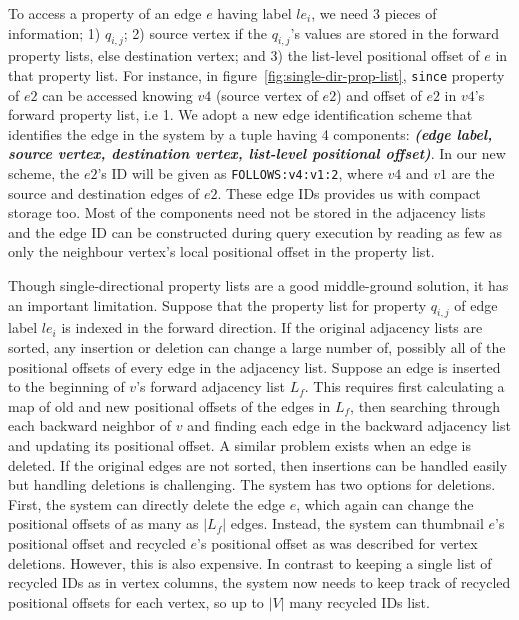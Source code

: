 To access a property of an edge $e$ having label $le_i$, we need 3 pieces of information; 1) $q_{i,j}$; 2) source vertex if the $q_{i,j}$'s values are stored in the forward property lists, else destination vertex; and 3) the list-level positional offset of $e$ in that property list. For instance, in figure~\ref{fig:single-dir-prop-list}, \texttt{since} property of $e2$ can be accessed knowing $v4$ (source vertex of $e2$) and offset of $e2$ in $v4$'s forward property list, i.e 1. We adopt a new edge identification scheme that identifies the edge in the system by a tuple having 4 components: \textbf{\emph{(edge label, source vertex, destination vertex, list-level positional offset)}}. In our new scheme, the $e2$'s ID will be given as \texttt{FOLLOWS:v4:v1:2}, where $v4$ and $v1$ are the source and destination edges of $e2$. These edge IDs provides us with compact storage too. Most of the components need not be stored in the adjacency lists and the edge ID can be constructed during query execution by reading as few as only the neighbour vertex's local positional offset in the property list.

 Though single-directional property lists are a good middle-ground solution, it has an important limitation. Suppose that the property list for property $q_{i,j}$ of edge label $le_i$ is indexed in the forward direction. If the original adjacency lists are sorted,  any insertion or deletion can change a large number of, possibly all of the positional offsets of every edge in the adjacency list. Suppose an edge is inserted to the beginning of $v$'s forward adjacency list $L_f$. This requires first calculating a map of old and new positional offsets of the edges in $L_f$, then searching through each backward neighbor of $v$ and finding each edge in the backward adjacency list and updating its positional offset. A similar problem exists when an edge is deleted. If the original edges are not sorted, then insertions can be handled easily but handling deletions is challenging. The system has two options for deletions. First, the system can directly delete the edge $e$, which again can change the positional offsets of as many as $|L_f|$ edges. Instead, the system can thumbnail $e$'s positional offset and recycled $e$'s positional offset as was described for vertex deletions. However, this is also expensive. In contrast to keeping a single list of recycled IDs as in vertex columns, the system now needs to keep track of recycled positional offsets for each vertex, so up to $|V|$ many recycled IDs list.

